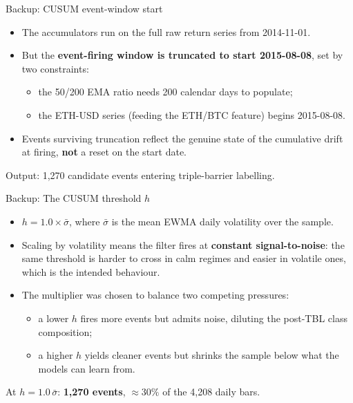 \documentclass[aspectratio=169, t]{beamer}
\begin{document}
\begin{frame}{Backup: CUSUM event-window start}
\vspace{-0.4em}

\begin{itemize}\footnotesize
  \item The accumulators run on the full raw return series from 2014-11-01.
  \item But the \textbf{event-firing window is truncated to start 2015-08-08}, set by two constraints:
  \begin{itemize}\footnotesize
    \item the 50/200 EMA ratio needs 200 calendar days to populate;
    \item the ETH-USD series (feeding the ETH/BTC feature) begins 2015-08-08.
  \end{itemize}
  \item Events surviving truncation reflect the genuine state of the cumulative drift at firing, \textbf{not} a reset on the start date.
\end{itemize}

\vspace{0.5em}
\centering
{\footnotesize Output: 1{,}270 candidate events entering triple-barrier labelling.}
\end{frame}


\begin{frame}{Backup: The CUSUM threshold $h$}
\vspace{-0.4em}

\begin{itemize}\footnotesize\setlength{\itemsep}{4pt}
  \item $h = 1.0 \times \bar{\sigma}$, where $\bar{\sigma}$ is the mean EWMA daily volatility over the sample.
  \item Scaling by volatility means the filter fires at \textbf{constant signal-to-noise}: the same threshold is harder to cross in calm regimes and easier in volatile ones, which is the intended behaviour.
  \item The multiplier was chosen to balance two competing pressures:
  \begin{itemize}\footnotesize
    \item a lower $h$ fires more events but admits noise, diluting the post-TBL class composition;
    \item a higher $h$ yields cleaner events but shrinks the sample below what the models can learn from.
  \end{itemize}
\end{itemize}

\vspace{0.6em}
\centering
{\footnotesize At $h = 1.0\,\bar{\sigma}$: \textbf{1{,}270 events}, $\approx 30\%$ of the 4{,}208 daily bars.}
\end{frame}
\end{document}
